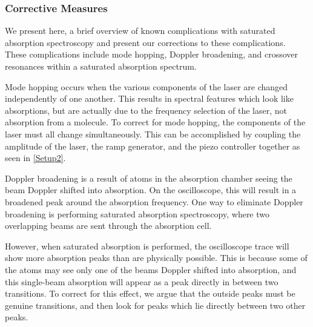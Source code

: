 \documentclass[12pt]{article}
\newcommand{\red}[1]{\textbf{\textcolor{myred1}{#1}}} %
\begin{document}
%	

	\subsubsection*{Corrective Measures}
	We present here, a brief overview of known complications with saturated absorption spectroscopy and present our corrections to these complications. These complications include mode hopping, Doppler broadening, and crossover resonances within a saturated absorption spectrum. 
	
	Mode hopping occurs when the various components of the laser are changed independently of one another. This results in spectral features which look like absorptions, but are actually due to the frequency selection of the laser, not absorption from a molecule. To correct for mode hopping, the components of the laser must all change simultaneously. This can be accomplished by coupling the amplitude of the laser, the ramp generator, and the piezo controller together as seen in \cref{Setup2}. 
	
	Doppler broadening is a result of atoms in the absorption chamber seeing the beam Doppler shifted into absorption. On the oscilloscope, this will result in a broadened peak around the absorption frequency. One way to eliminate Doppler broadening is performing saturated absorption spectroscopy, where two overlapping beams are sent through the absorption cell.
	
	However, when saturated absorption is performed, the oscilloscope trace will show more absorption peaks than are physically possible. This is because some of the atoms may see only one of the beams Doppler shifted into absorption, and this single-beam absorption will appear as a peak directly in between two transitions. To correct for this effect, we argue that the outside peaks must be genuine transitions, and then look for peaks which lie directly between two other peaks.
	
\end{document}
